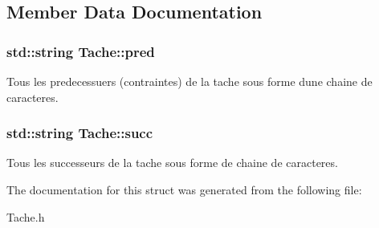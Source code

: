 \subsection{Member Data Documentation}
\subsubsection[{\texorpdfstring{pred}{pred}}]{\setlength{\rightskip}{0pt plus 5cm}std\+::string Tache\+::pred}\hypertarget{structTache_a666112b11d4e1580b7fa29ea486fa14e}{}\label{structTache_a666112b11d4e1580b7fa29ea486fa14e}
Tous les predecessuers (contraintes) de la tache sous forme d\textquotesingle{}une chaine de caracteres. 
\subsubsection[{\texorpdfstring{succ}{succ}}]{\setlength{\rightskip}{0pt plus 5cm}std\+::string Tache\+::succ}\hypertarget{structTache_a1becca92c78a099c6a2ef99fc0c829cf}{}\label{structTache_a1becca92c78a099c6a2ef99fc0c829cf}
Tous les successeurs de la tache sous forme de chaine de caracteres. 

The documentation for this struct was generated from the following file\+:\begin{DoxyCompactItemize}
\item 
Tache.\+h\end{DoxyCompactItemize}
